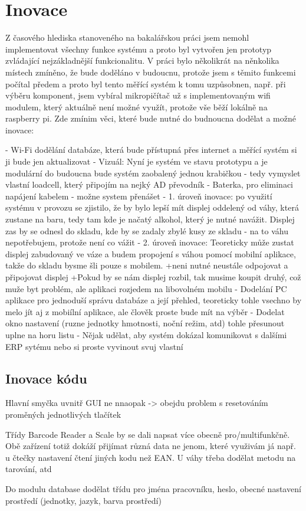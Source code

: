 \chapter{Inovace}
Z časového hlediska stanoveného na bakalářskou práci jsem nemohl implementovat všechny funkce systému a proto byl vytvořen jen prototyp zvládající nejzákladnější funkcionalitu.
V práci bylo několikrát na něnkolika místech zmíněno, že bude doděláno v budoucnu, protože jsem s těmito funkcemi počítal předem a proto byl tento měřící systém k tomu uzpůsobnen, např. při výběru komponent, jsem vybíral mikropičítač už s implementovaným wifi modulem, který aktuálně není možné využít, protože vše běží lokálně na raspberry pi.
Zde zmínim věci, které bude nutné do budnoucna dodělat a možné inovace:

- Wi-Fi dodělání databáze, která bude přístupná přes internet a měřící systém si ji bude jen aktualizovat
- Vizuál: Nyní je systém ve stavu prototypu a je modulární do budoucna bude systém zaobalený jednou krabičkou - tedy vymyslet vlastní loadcell, který připojím na nejký AD převodník
- Baterka, pro eliminaci napájení kabelem - možne system přenášet 
- 1. úroveň inovace: po využití systému v provozu se zjistilo, že by bylo lepší mít displej oddelený od váhy, která zustane na baru, tedy tam kde je načatý alkohol, který je nutné navážit. Displej zas by se odnesl do skladu, kde by se zadaly zbylé kusy ze skladu - na to váhu nepotřebujem, protože není co vážit
- 2. úroveň inovace: Teoreticky může zustat displej zabudovaný ve váze a budem propojení s váhou pomocí mobilní aplikace, takže do skladu bysme šli pouze s mobilem.
    +neni nutné neustále odpojovat a připojovat displej
    +Pokud by se nám displej rozbil, tak musime koupit druhý, což muže byt problém, ale aplikaci rozjedem na libovolném mobilu
- Dodelání PC aplikace pro jednoduší správu databáze a její přehled, teoreticky tohle vsechno by melo jít aj z mobiílní aplikace, ale člověk proste bude mít na výběr 
- Dodelat okno nastavení (ruzne jednotky hmotnosti, noční režim, atd) tohle přesunout uplne na horu listu
- Nějak udělat, aby systém dokázal komunikovat s dalšími ERP sytému nebo si proste vyvinout svuj vlastní

\section{Inovace kódu}

Hlavní smyčka uvnitř GUI ne nnaopak -> obejdu problem s resetováním proměných jednotlivých tlačítek

Třídy Barcode Reader a Scale by se dali napsat více obecně pro/multifunkčně. Obě zařízení totiž dokáží přijímat různá data ne jenom, které využivám já např. u čtečky nastavení čtení jiných kodu než EAN. U váhy třeba dodělat metodu na tarování, atd

Do modulu database dodělat třídu pro jména pracovníku, heslo, obecné nastavení prostředí (jednotky, jazyk, barva prostředí)

